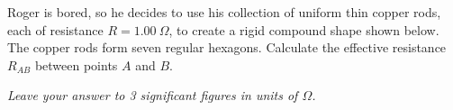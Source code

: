 \begin{prbm}[Hexagonmania]
Roger is bored, so he decides to use his collection of uniform thin copper rods, each of resistance $R = 1.00\:\Omega$, to create a rigid compound shape shown below. The copper rods form seven regular hexagons. Calculate the effective resistance $R_{AB}$ between points $A$ and $B$.

\textit{Leave your answer to 3 significant figures in units of $\Omega$.}
\end{prbm}

\begin{solution}
\end{solution}
\pagebreak